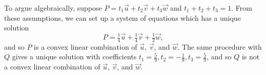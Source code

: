 \begin{exercises}
\begin{problist}
\begin{solution}
		To argue algebraically, suppose 
		$P=t_{1}\vec u + t_{2}\vec v + t_{3} \vec w$ and
		$t_{1}+t_{2}+t_{3}=1$. From these assumptions, we can set up a system of equations
		which has a unique solution
		\[
			P=\tfrac14 \vec u + \tfrac14 \vec v + \tfrac12 \vec w,
		\]
		and so $P$ is a convex linear combination of $\vec u$, $\vec v$, and $\vec w$.
		 The same procedure with $Q$ gives a unique solution with coefficients
		$t_{1}=\frac 59, t_{2}=-\frac 19, t_{3}=\frac 59$, and so $Q$ is
		not a convex linear combination of $\vec u$, $\vec v$, and $\vec w$.

	\end{solution}
	\end{problist}
\end{exercises}
